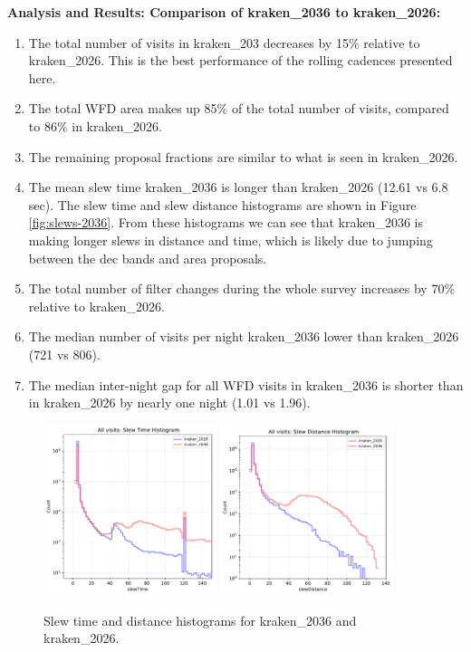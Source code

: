 \documentclass[DM,authoryear,toc]{lsstdoc}
\begin{document}
\textbf{Analysis and Results: Comparison of kraken\_2036 to kraken\_2026:}

\begin{enumerate}
\item The total number of visits in kraken\_203 decreases by 15$\%$ relative to kraken\_2026. This is the best performance
of the rolling cadences presented here.
\item The total WFD area makes up 85$\%$ of the total number of visits, compared to 86$\%$ in kraken\_2026.
\item The remaining proposal fractions are similar to what is seen in kraken\_2026.
\item The mean slew time kraken\_2036 is longer than kraken\_2026 (12.61 vs 6.8 sec). The slew time and slew distance
histograms are shown in Figure \autoref{fig:slews-2036}. From these histograms we can see that kraken\_2036 is making longer
slews in distance and time, which is likely due to jumping between the dec bands and area proposals.
\item The total number of filter changes during the whole survey increases by 70$\%$ relative to kraken\_2026.
\item The median number of visits per night kraken\_2036 lower than kraken\_2026 (721 vs 806).
\item The median inter-night gap for all WFD visits in kraken\_2036 is shorter than in kraken\_2026 by nearly one night (1.01 vs 1.96).
\end{enumerate}


\begin{figure}[ht]
\centering
\includegraphics[width=0.45\textwidth]{figures/kraken_2026_kraken_2036_Slew_Time_Histogram_All_visits_ONED_ComboBinnedData.pdf}
\includegraphics[width=0.45\textwidth]{figures/kraken_2026_kraken_2036_Slew_Distance_Histogram_All_visits_ONED_ComboBinnedData.pdf}
\caption{Slew time and distance histograms for kraken\_2036 and  kraken\_2026.}
\label{fig:slews-2036}
\end{figure}
\end{document}

